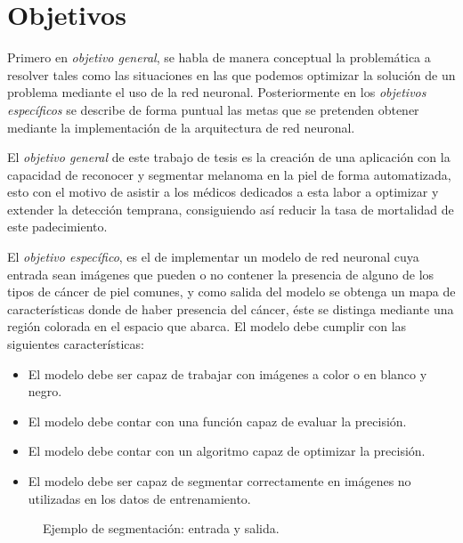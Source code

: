 \section{Objetivos}
Primero en \emph{objetivo general}, se habla de manera conceptual la problemática a resolver tales como las situaciones en las que podemos optimizar la solución de un problema mediante el uso de la red neuronal. Posteriormente en los \emph{objetivos específicos} se describe de forma puntual las metas que se pretenden obtener mediante la implementación de la arquitectura de red neuronal.

El \emph{objetivo general} de este trabajo de tesis es la creación de una aplicación con la capacidad de reconocer y segmentar melanoma en la piel de forma automatizada, esto con el motivo de asistir a los médicos dedicados a esta labor a optimizar y extender la detección temprana, consiguiendo así reducir la tasa de mortalidad de este padecimiento.

El \emph{objetivo específico}, es el de implementar un modelo de red neuronal cuya entrada sean imágenes que pueden o no contener la presencia de alguno de los tipos de cáncer de piel comunes, y como salida del modelo se obtenga un mapa de características donde de haber presencia del cáncer, éste se distinga mediante una región colorada en el espacio que abarca. El modelo debe cumplir con las siguientes características:

\begin{itemize}
    \item El modelo debe ser capaz de trabajar con imágenes a color o en blanco y negro.
    \item El modelo debe contar con una función capaz de evaluar la precisión.
    \item El modelo debe contar con un algoritmo capaz de optimizar la precisión.
    \item El modelo debe ser capaz de segmentar correctamente en imágenes no utilizadas en los datos de entrenamiento.
\end{itemize}

\begin{figure}[!htp]
    \centering
    \qquad
    \caption{Ejemplo de segmentación: entrada y salida.}
    \label{data_1}
\end{figure}

